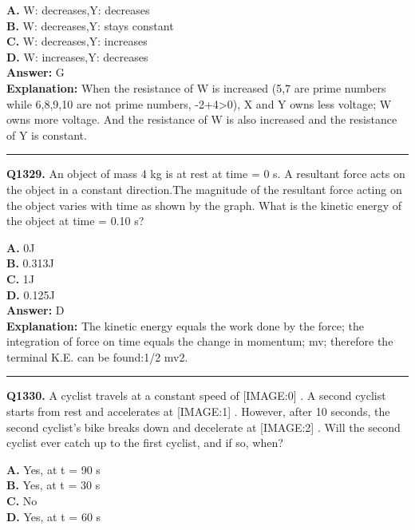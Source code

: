 \documentclass[12pt]{article}
\begin{document}
\textbf{A.} W: decreases,Y: decreases \\
\textbf{B.} W: decreases,Y: stays constant \\
\textbf{C.} W: decreases,Y: increases \\
\textbf{D.} W: increases,Y: decreases \\

\textbf{Answer:} G \\
\textbf{Explanation:} When the resistance of W is increased (5,7 are prime numbers while 6,8,9,10 are not prime numbers, -2+4>0), X and Y owns less voltage; W owns more voltage. And the resistance of W is also increased and the resistance of Y is constant.

\hrule
\vspace{1em}


\noindent
\textbf{Q1329.} An object of mass 4 kg is at rest at time = 0 s. A resultant force acts on the object in a constant direction.The magnitude of the resultant force acting on the object varies with time as shown by
the graph.
What is the kinetic energy of the object at time = 0.10 s?



\textbf{A.} 0J \\
\textbf{B.} 0.313J \\
\textbf{C.} 1J \\
\textbf{D.} 0.125J \\

\textbf{Answer:} D \\
\textbf{Explanation:} The kinetic energy equals the work done by the force; the integration of force on time equals the change in momentum; mv; therefore the terminal K.E. can be found:1/2 mv2.

\hrule
\vspace{1em}


\noindent
\textbf{Q1330.} A cyclist travels at a constant speed of
[IMAGE:0]
. A second cyclist starts from rest and accelerates at
[IMAGE:1]
. However, after 10 seconds, the second cyclist's bike breaks down and decelerate at
[IMAGE:2]
. Will the second cyclist ever catch up to the first cyclist, and if so, when?



\textbf{A.} Yes, at t = 90 s \\
\textbf{B.} Yes, at t = 30 s \\
\textbf{C.} No \\
\textbf{D.} Yes, at t = 60 s \\
\end{document}
